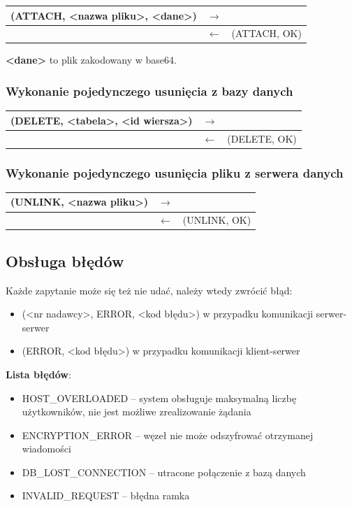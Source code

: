 \begin{longtable}{| p{} | p{}| p{} |} 
\hline
(ATTACH, <nazwa pliku>, <dane>) & $\rightarrow$ &  \\ \hline
 & $\leftarrow$ & (ATTACH, OK) \\ \hline
\end{longtable}
\textbf{<dane>} to plik zakodowany w base64.

\subsubsection{Wykonanie pojedynczego usunięcia z bazy danych}

\begin{longtable}{| p{} | p{}| p{} |} 
\hline
(DELETE, <tabela>, <id wiersza>) & $\rightarrow$ &  \\ \hline
 & $\leftarrow$ & (DELETE, OK) \\ \hline
\end{longtable}

\subsubsection{Wykonanie pojedynczego usunięcia pliku z serwera danych}

\begin{longtable}{| p{} | p{}| p{} |} 
\hline
(UNLINK, <nazwa pliku>) & $\rightarrow$ &  \\ \hline
 & $\leftarrow$ & (UNLINK, OK) \\ \hline
\end{longtable}

\subsection{Obsługa błędów}
Każde zapytanie może się też nie udać, należy wtedy zwrócić błąd:
\begin{itemize}
\item (<nr nadawcy>, ERROR, <kod błędu>) w przypadku komunikacji serwer-serwer
\item (ERROR, <kod błędu>) w przypadku komunikacji klient-serwer\newline
\end{itemize}

\textbf{Lista błędów}:
\begin{itemize}
\item HOST\_OVERLOADED – system obsługuje maksymalną liczbę użytkowników, nie jest możliwe zrealizowanie żądania
\item ENCRYPTION\_ERROR – węzeł nie może odszyfrować otrzymanej wiadomości
\item DB\_LOST\_CONNECTION – utracone połączenie z bazą danych
\item INVALID\_REQUEST     – błędna ramka

\end{itemize}


